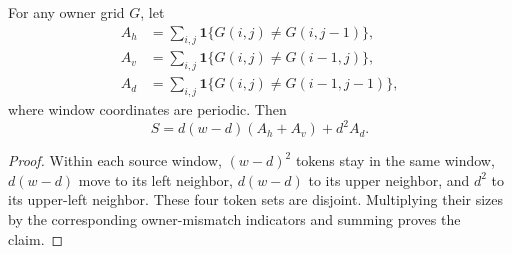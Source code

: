 \begin{lemma}
\label{lem:shift-neighbor-decomposition}
For any owner grid $G$, let
\begin{align}
 A_h&=\sum_{i,j}\mathbf{1}\{G(i,j)\ne G(i,j-1)\},\\
 A_v&=\sum_{i,j}\mathbf{1}\{G(i,j)\ne G(i-1,j)\},\\
 A_d&=\sum_{i,j}\mathbf{1}\{G(i,j)\ne G(i-1,j-1)\},
\end{align}
where window coordinates are periodic. Then
\begin{equation}
 S=d(w-d)(A_h+A_v)+d^2A_d.
 \label{eq:shift-neighbor-count}
\end{equation}
\end{lemma}
\begin{proof}
Within each source window, $(w-d)^2$ tokens stay in the same window,
$d(w-d)$ move to its left neighbor, $d(w-d)$ to its upper neighbor,
and $d^2$ to its upper-left neighbor. These four token sets are disjoint.
Multiplying their sizes by the corresponding owner-mismatch indicators
and summing proves the claim.
\end{proof}


